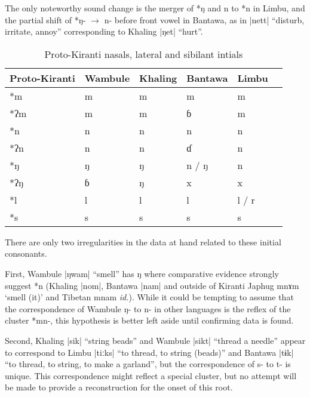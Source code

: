 \documentclass[oldfontcommands,oneside,a4paper,11pt]{article}
\newcommand{\ipa}[1]{{\phon\mbox{#1}}} %
\newcommand{\dhatu}[2]{|\ipa{#1}| ``#2''}
\newcommand{\change}[2]{*\ipa{#1} $\rightarrow$ \ipa{#2}}
\begin{document}
The only noteworthy sound change is the merger of *\ipa{ŋ} and \ipa{n} to *\ipa{n} in Limbu, and the partial shift of \change{ŋ-}{n-} before front vowel in Bantawa, as in \dhatu{nett}{disturb, irritate, annoy} corresponding to Khaling \dhatu{ŋet}{hurt}.

\begin{table}[H]
\caption{Proto-Kiranti nasals, lateral and sibilant intials} \centering \label{tab:nasals}
\begin{tabular}{llllll}
\toprule
Proto-Kiranti & Wambule & Khaling & Bantawa & Limbu \\
\midrule
\ipa{*m} & \ipa{m} & \ipa{m} & \ipa{m} & \ipa{m}  \\
\ipa{*ʔm} & \ipa{m} & \ipa{m} & \ipa{ɓ} & \ipa{m}  \\
\ipa{*n} & \ipa{n} & \ipa{n} & \ipa{n} & \ipa{n}  \\
\ipa{*ʔn} & \ipa{n} & \ipa{n} & \ipa{ɗ} & \ipa{n}  \\
\ipa{*ŋ} & \ipa{ŋ} & \ipa{ŋ} & \ipa{n} / \ipa{ŋ} & \ipa{n}  \\
\ipa{*ʔŋ} &  \ipa{ɓ}  & \ipa{ŋ} & x &x  \\
\ipa{*l} & \ipa{l} & \ipa{l} & \ipa{l} & \ipa{l} / \ipa{r} \\
\ipa{*s} & \ipa{s} & \ipa{s} & \ipa{s} & \ipa{s}  \\
\bottomrule
\end{tabular}
\end{table}

There are only two irregularities in the data at hand related to these initial consonants.

First, Wambule \dhatu{ŋwam}{smell} has \ipa{ŋ} where comparative evidence strongly suggest *\ipa{n} (Khaling |\ipa{nom}|, Bantawa  |\ipa{nam}| and outside of Kiranti Japhug \ipa{mnɤm} `smell (it)' and Tibetan \ipa{mnam} \textit{id.}). While it could be tempting to assume that the correspondence of Wambule \ipa{ŋ-} to \ipa{n-} in other languages is the reflex of the cluster *\ipa{mn-}, this hypothesis is better left aside until confirming data is found.

Second, Khaling \dhatu{sik}{string beads} and Wambule \dhatu{sikt}{thread a needle} appear to correspond to Limbu \dhatu{tiːks}{to thread, to string (beads)}  and Bantawa \dhatu{tɨk}{to thread, to string, to make a garland}, but the correspondence of \ipa{s-} to \ipa{t-} is unique. This correspondence might reflect a special cluster, but no attempt will be made to provide a reconstruction for the onset of this root.
\end{document}
